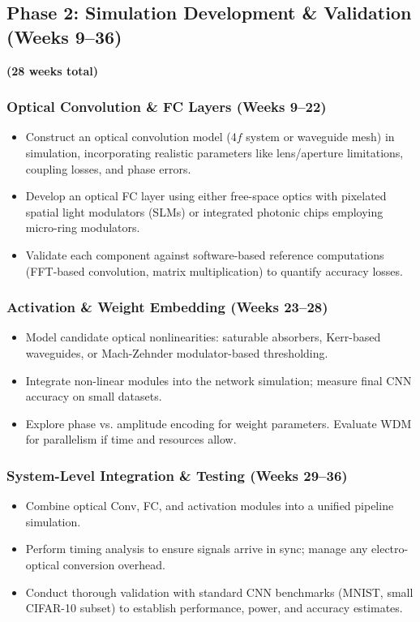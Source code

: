 \documentclass[conference]{IEEEtran}
\begin{document}
\subsection{Phase 2: Simulation Development \& Validation (Weeks 9--36)}
\textbf{(28 weeks total)}

\subsubsection{Optical Convolution \& FC Layers (Weeks 9--22)}
\begin{itemize}
    \item Construct an optical convolution model (4$f$ system or waveguide mesh) in simulation, incorporating realistic parameters like lens/aperture limitations, coupling losses, and phase errors.
    \item Develop an optical FC layer using either free-space optics with pixelated spatial light modulators (SLMs) or integrated photonic chips employing micro-ring modulators. 
    \item Validate each component against software-based reference computations (FFT-based convolution, matrix multiplication) to quantify accuracy losses.
\end{itemize}

\subsubsection{Activation \& Weight Embedding (Weeks 23--28)}
\begin{itemize}
    \item Model candidate optical nonlinearities: saturable absorbers, Kerr-based waveguides, or Mach-Zehnder modulator-based thresholding.
    \item Integrate non-linear modules into the network simulation; measure final CNN accuracy on small datasets.
    \item Explore phase vs. amplitude encoding for weight parameters. Evaluate WDM for parallelism if time and resources allow.
\end{itemize}

\subsubsection{System-Level Integration \& Testing (Weeks 29--36)}
\begin{itemize}
    \item Combine optical Conv, FC, and activation modules into a unified pipeline simulation.
    \item Perform timing analysis to ensure signals arrive in sync; manage any electro-optical conversion overhead.
    \item Conduct thorough validation with standard CNN benchmarks (MNIST, small CIFAR-10 subset) to establish performance, power, and accuracy estimates.
\end{itemize}
\end{document}
